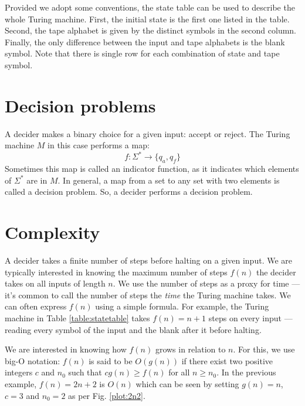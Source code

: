 \documentclass{iansnotes}
\begin{document}
  Provided we adopt some conventions, the state table can be used to describe the whole Turing machine.
  First, the initial state is the first one listed in the table.
  Second, the tape alphabet is given by the distinct symbols in the second column.
  Finally, the only difference between the input and tape alphabets is the blank symbol.
  Note that there is single row for each combination of state and tape symbol.


\section{Decision problems}
  A decider makes a binary choice for a given input: accept or reject.
  The Turing machine \( M \) in this case performs a map:
  \[ f:\Sigma^* \rightarrow \{ q_a, q_f \} \]
  Sometimes this map is called an indicator function, as it indicates which elements of \( \Sigma^* \) are in \( M \).
  In general, a map from a set to any set with two elements is called a decision problem.
  So, a decider performs a decision problem.

\section{Complexity}
  A decider takes a finite number of steps before halting on a given input.
  We are typically interested in knowing the maximum number of steps \( f(n) \) the decider takes on all inputs of length \( n \).
  We use the number of steps as a proxy for time --- it's common to call the number of steps the \emph{time} the Turing machine takes.
  We can often express \( f(n) \) using a simple formula.
  For example, the Turing machine in Table \ref{table:statetable} takes \( f(n) = n + 1 \) steps on every input --- reading every symbol of the input and the blank after it before halting.
  
  We are interested in knowing how \( f(n) \) grows in relation to \( n \).
  For this, we use big-O notation:
   \( f(n) \) is said to be \( O(g(n)) \) if there exist two positive integers \( c \) and \( n_0 \) such that \( cg(n) \geq f(n) \) for all \(n \geq n_0 \).
  In the previous example, \( f(n) = 2n + 2 \) is \( O(n) \) which can be seen by setting \( g(n) = n \), \( c = 3 \) and \( n_0 = 2 \) as per Fig. \ref{plot:2n2}.

\end{document}
